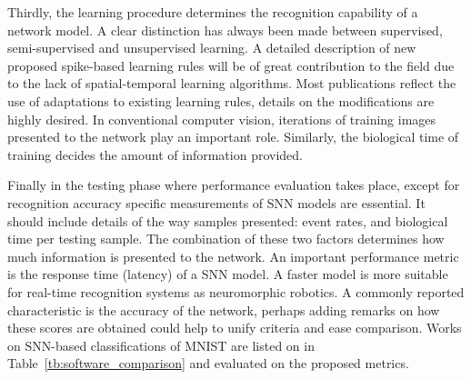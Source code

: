 Thirdly, the learning procedure determines the recognition capability of a network model.
A clear distinction has always been made between supervised, semi-supervised and unsupervised learning.
A detailed description of new proposed spike-based learning rules will be of great contribution to the field due to the lack of spatial-temporal learning algorithms.
Most publications reflect the use of adaptations to existing learning rules, details on the modifications are highly desired.
In conventional computer vision, iterations of training images presented to the network play an important role.
Similarly, the biological time of training decides the amount of information provided.



Finally in the testing phase where performance evaluation takes place, except for recognition accuracy specific measurements of SNN models are essential.
It should include details of the way samples presented: event rates, and biological time per testing sample.
The combination of these two factors determines how much information is presented to the network.
An important performance metric is the response time (latency) of a SNN model.
A faster model is more suitable for real-time recognition systems as neuromorphic robotics.
A commonly reported characteristic is the accuracy of the network, perhaps adding remarks on how these scores are obtained could help to unify criteria and ease comparison.
Works on SNN-based classifications of MNIST are listed on in Table~\ref{tb:software_comparison} and evaluated on the proposed metrics.

